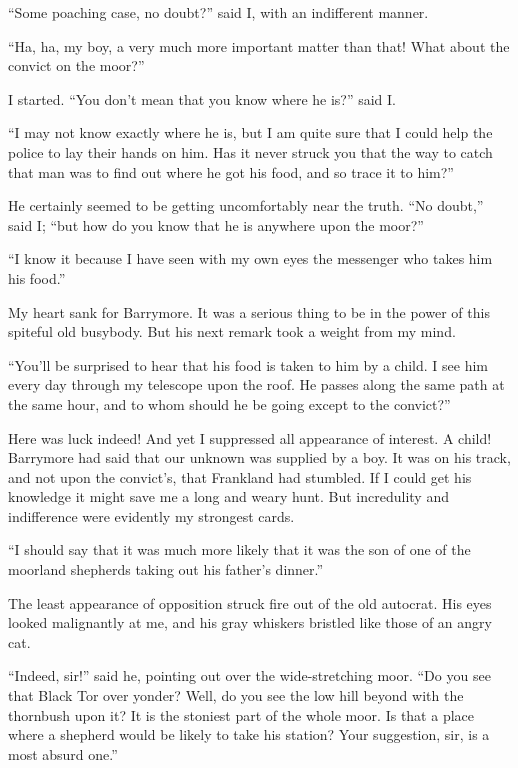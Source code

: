 \documentclass[paper=a5,BCOR=7mm,twoside,DIV=calc,12pt,usegeometry,openany,chapterprefix,endperiod,headings=big]{scrbook} %
\begin{document}
\enquote{Some poaching case, no doubt?} said I, with an indifferent manner.

\enquote{Ha, ha, my boy, a very much more important matter than that! What about the convict on the moor?}

I started. \enquote{You don't mean that you know where he is?} said I.

\enquote{I may not know exactly where he is, but I am quite sure that I could help the police to lay their hands on him. Has it never struck you that the way to catch that man was to find out where he got his food, and so trace it to him?}

He certainly seemed to be getting uncomfortably near the truth. \enquote{No doubt,} said I; \enquote{but how do you know that he is anywhere upon the moor?}

\enquote{I know it because I have seen with my own eyes the messenger who takes him his food.}

My heart sank for Barrymore. It was a serious thing to be in the power of this spiteful old busybody. But his next remark took a weight from my mind.

\enquote{You'll be surprised to hear that his food is taken to him by a child. I see him every day through my telescope upon the roof. He passes along the same path at the same hour, and to whom should he be going except to the convict?}

Here was luck indeed! And yet I suppressed all appearance of interest. A child! Barrymore had said that our unknown was supplied by a boy. It was on his track, and not upon the convict's, that Frankland had stumbled. If I could get his knowledge it might save me a long and weary hunt. But incredulity and indifference were evidently my strongest cards.

\enquote{I should say that it was much more likely that it was the son of one of the moorland shepherds taking out his father's dinner.}

The least appearance of opposition struck fire out of the old autocrat. His eyes looked malignantly at me, and his gray whiskers bristled like those of an angry cat.

\enquote{Indeed, sir!} said he, pointing out over the wide-stretching moor. \enquote{Do you see that Black Tor over yonder? Well, do you see the low hill beyond with the thornbush upon it? It is the stoniest part of the whole moor. Is that a place where a shepherd would be likely to take his station? Your suggestion, sir, is a most absurd one.}
\end{document}
